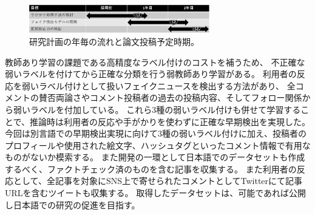 \setlength\intextsep{0pt}
\setlength\textfloatsep{0pt}
\begin{figure}
    \centering
    \includegraphics[width=0.7\textwidth]{figs/plan.pdf}
    \vspace{-1cm} 
    \caption{研究計画の年毎の流れと論文投稿予定時期。}
    \label{fig:plan}
\end{figure}
教師あり学習の課題である高精度なラベル付けのコストを補うため、
不正確な弱いラベルを付けてから正確な分類を行う弱教師あり学習がある。
利用者の反応を弱いラベル付けとして扱いフェイクニュースを検出する方法があり\cite{shu2020leveraging}、
全コメントの賛否両論さやコメント投稿者の過去の投稿内容、そしてフォロー関係から弱いラベルを付加している。
これら3種の弱いラベル付けも併せて学習することで、推論時は利用者の反応や手がかりを使わずに正確な早期検出を実現した。
今回は別言語での早期検出実現に向けて3種の弱いラベル付けに加え、投稿者のプロフィールや使用された絵文字、ハッシュタグといったコメント情報で有用なものがないか模索する。
また開発の一環として日本語でのデータセットも作成するべく、ファクトチェック済のものを含む記事を収集する。
また利用者の反応として、全記事を対象にSNS上で寄せられたコメントとしてTwitterにて記事URLを含むツイートも収集する。
取得したデータセットは、可能であれば公開し日本語での研究の促進を目指す。

